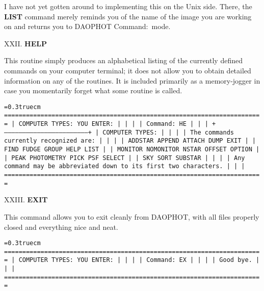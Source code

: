 I have not yet gotten around to implementing this on the Unix side.
There, the {\bf LIST} command merely reminds you of the name of the
image you are working on and returns you to DAOPHOT Command:\ mode.

\vfill
\eject
\noindent XXII.  {\bf HELP}

This routine simply produces an alphabetical listing of the currently
defined commands on your computer terminal; it does not allow you to
obtain detailed information on any of the routines.  It is included
primarily as a memory-jogger in case you momentarily forget what some
routine is called.

\bigskip
{\noindent\obeylines\obeyspaces\frenchspacing\tt\baselineskip=0.3truecm
=======================================================================
| COMPUTER TYPES:                                  YOU ENTER:         |
|                                                                     |
| Command:                                         HE                 |
|                                                                     |
+---------------------------------------------------------------------+
| COMPUTER TYPES:                                                     |
|                                                                     |
| The commands currently recognized are:                              |
|                                                                     |
|     ADDSTAR      APPEND       ATTACH       DUMP         EXIT        |
|     FIND         FUDGE        GROUP        HELP         LIST        |
|     MONITOR      NOMONITOR    NSTAR        OFFSET       OPTION      |
|     PEAK         PHOTOMETRY   PICK         PSF          SELECT      |
|     SKY          SORT         SUBSTAR                               |
|                                                                     |
| Any command may be abbreviated down to its first two characters.    |
|                                                                     |
=======================================================================
}

\vfill
\eject
\noindent XXIII.  {\bf EXIT}

This command allows you to exit cleanly from DAOPHOT, with all
files properly closed and everything nice and neat. 

\bigskip
{\noindent\obeylines\obeyspaces\frenchspacing\tt\baselineskip=0.3truecm
=======================================================================
| COMPUTER TYPES:                                      YOU ENTER:     |
|                                                                     |
| Command:                                             EX             |
|                                                                     |
| Good bye.                                                           |
|                                                                     |
=======================================================================
}


